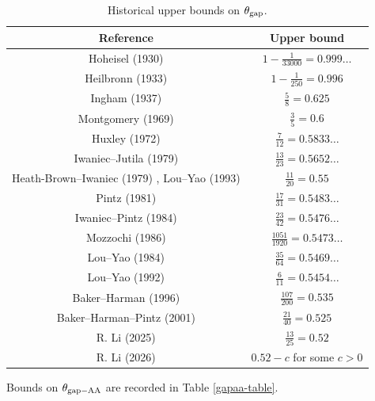 \begin{table}[ht]
    \caption{Historical upper bounds on $\theta_{\mathrm{gap}}$.}
    \label{gapmax-table}
    \centering
    \renewcommand{\arraystretch}{1.2}
    \begin{tabular}{|c|c|}
    \hline
    Reference & Upper bound \\
    \hline
    Hoheisel (1930) \cite{hoheisel_1930} & $1 - \frac{1}{33000} = 0.999\dots$ \\
    \hline
    Heilbronn (1933) \cite{heilbronn_1933} & $1 - \frac{1}{250} = 0.996$ \\
    \hline
    Ingham (1937) \cite{ingham_difference_1937} & $\frac{5}{8} = 0.625$ \\
    \hline
    Montgomery (1969) \cite{montgomery_1969} & $\frac{3}{5} = 0.6$ \\
    \hline
    Huxley (1972) \cite{Huxley} & $\frac{7}{12} = 0.5833\dots$ \\
    \hline
    Iwaniec--Jutila (1979)\cite{iwaniec-jutila} & $\frac{13}{23} = 0.5652\dots$ \\
    \hline
    Heath-Brown--Iwaniec (1979) \cite{heathbrown_iwaniec_1979}, Lou--Yao (1993) \cite{lou_yao_number_1993}& $\frac{11}{20} = 0.55$ \\
    \hline
    Pintz (1981) \cite{pintz_1981} & $\frac{17}{31} = 0.5483\dots$ \\
    \hline
    Iwaniec--Pintz (1984) \cite{iwaniec-pintz} & $\frac{23}{42} = 0.5476\dots$\\
    \hline
    Mozzochi (1986) \cite{mozzochi-consecutive} & $\frac{1051}{1920} = 0.5473\dots$ \\
    \hline
    Lou--Yao (1984) \cite{LouYao3564} & $\frac{35}{64} = 0.5469\dots$\\
    \hline
    Lou--Yao (1992) \cite{lou-yao-chebychev} & $\frac{6}{11} = 0.5454\dots$\\
    \hline
    Baker--Harman (1996) \cite{baker-harman} & $\frac{107}{200} = 0.535$\\
    \hline
    Baker--Harman--Pintz (2001) \cite{baker-harman-pintz} & $\frac{21}{40} = 0.525$ \\
    \hline
    R. Li (2025) \cite{li_number_2025} & $\frac{13}{25} = 0.52$\\
    \hline
    R. Li (2026) \cite{li_trilinear_2026} & $0.52 - c$ for some $c > 0$\\
    \hline
    \end{tabular}
    \end{table}

Bounds on $\theta_{\mathrm{gap-AA}}$ are recorded in Table \ref{gapaa-table}.

